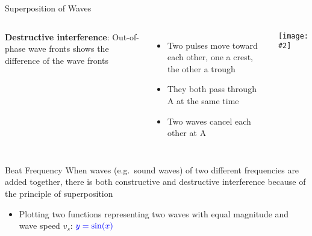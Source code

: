\documentclass[12pt,aspectratio=169]{beamer}
\newcommand{\pic}[2]{\texttt{[image: \#2]}}
\begin{document}
\begin{frame}{Superposition of Waves}
  \begin{columns}
    \textbf{Destructive interference}: Out-of-phase wave fronts shows the
    difference of the wave fronts
    \begin{itemize}
    \item Two pulses move toward each other, one a crest, the other a trough
    \item They both pass through A at the same time
    \item Two waves cancel each other at A
    \end{itemize}
        
    \pic1{destructive}
  \end{columns}
\end{frame}


\begin{frame}{Beat Frequency}
  When waves (e.g.\ sound waves) of two different frequencies are added
  together, there is both constructive and destructive interference because of
  the principle of superposition
  \begin{itemize}
  \item Plotting two functions representing two waves with equal magnitude
    and wave speed $v_s$: $\color{blue}{y=\sin(x)}$
  \end{itemize}
  \begin{center}
    \vspace{-.1in}
  \end{center}
\end{frame}
\end{document}
